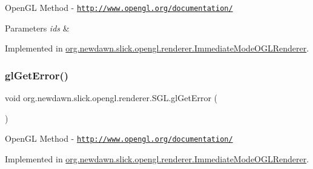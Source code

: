 Open\+GL Method -\/  \href{http://www.opengl.org/documentation/}{\tt http\+://www.\+opengl.\+org/documentation/}


\begin{DoxyParams}{Parameters}
{\em ids} & \\
\hline
\end{DoxyParams}


Implemented in \mbox{\hyperlink{classorg_1_1newdawn_1_1slick_1_1opengl_1_1renderer_1_1_immediate_mode_o_g_l_renderer_a15e8cc47f15d46863da6e839bcffd6f4}{org.\+newdawn.\+slick.\+opengl.\+renderer.\+Immediate\+Mode\+O\+G\+L\+Renderer}}.

\mbox{\label{interfaceorg_1_1newdawn_1_1slick_1_1opengl_1_1renderer_1_1_s_g_l_ad629cdbc2f5bd7148fad9c93b778ff47}} 
\subsubsection{\texorpdfstring{gl\+Get\+Error()}{glGetError()}}
{\footnotesize\ttfamily void org.\+newdawn.\+slick.\+opengl.\+renderer.\+S\+G\+L.\+gl\+Get\+Error (\begin{DoxyParamCaption}{ }\end{DoxyParamCaption})}

Open\+GL Method -\/  \href{http://www.opengl.org/documentation/}{\tt http\+://www.\+opengl.\+org/documentation/} 

Implemented in \mbox{\hyperlink{classorg_1_1newdawn_1_1slick_1_1opengl_1_1renderer_1_1_immediate_mode_o_g_l_renderer_a54006e3c777d249f21efc1cfa1b8dad3}{org.\+newdawn.\+slick.\+opengl.\+renderer.\+Immediate\+Mode\+O\+G\+L\+Renderer}}.

\mbox{\label{interfaceorg_1_1newdawn_1_1slick_1_1opengl_1_1renderer_1_1_s_g_l_aa9013a2eb8ec3fa76714ed1cfcb6f5bf}} 
